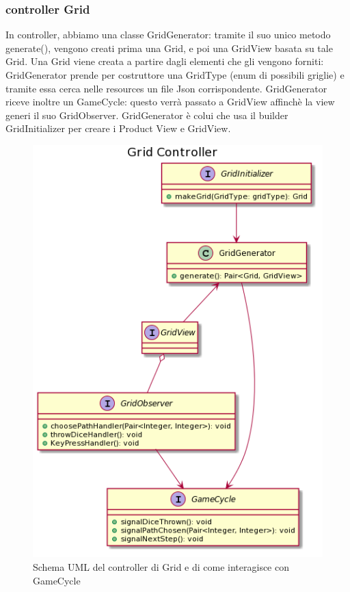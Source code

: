\documentclass[a4paper,12pt]{report}
\begin{document}
    \subsubsection {controller Grid}
	In controller, abbiamo una classe GridGenerator: tramite il suo unico metodo generate(), vengono creati prima una Grid, e poi una GridView basata su tale Grid.
	Una Grid viene creata a partire dagli elementi che gli vengono forniti: GridGenerator prende per costruttore una GridType (enum di possibili griglie) e tramite essa cerca nelle resources un file Json corrispondente.
	GridGenerator riceve inoltre un GameCycle: questo verrà passato a GridView affinchè la view generi il suo GridObserver.
    GridGenerator è colui che usa il builder GridInitializer per creare i Product View e GridView.

	\begin{figure}[h]
	\centering{}
	\includegraphics[width=130mm]{images/ascenzo/grid_controller.png}
	\caption{Schema UML del controller di Grid e di come interagisce con GameCycle}
	\label{img:gridcontroller}
	\end{figure}
\end{document}
